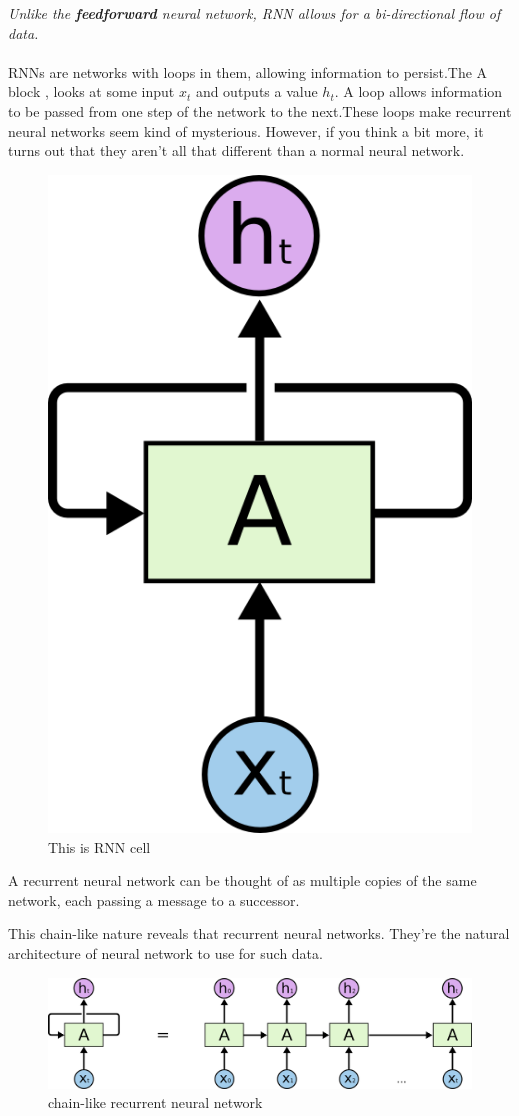 \textit{Unlike the \textbf{feedforward} neural network, RNN allows for a bi-directional flow of data.}\\\\
RNNs are networks with loops in them, allowing information to persist.The A block , looks at some input $x_t$ and outputs a value $h_t$. A loop allows information to be passed from one step of the network to the next.These loops make recurrent neural networks seem kind of mysterious. However, if you think a bit more, it turns out that they aren’t all that different than a normal neural network.
  \begin{figure}[H]%
    \center%
    \includegraphics[width=.3\textwidth]{images/amir/RNN-rolled.png}%
    \caption[Recurrent Neural Networks]{This is RNN cell}\label{fig:RNN cell}%
  \end{figure}
  \indent A recurrent neural network can be thought of as multiple copies of the same network, each passing a message to a successor.

This chain-like nature reveals that recurrent neural networks. They’re the natural architecture of neural network to use for such data.\\
  \begin{figure}[H]%
    \center%
    \includegraphics[width=\textwidth]{images/amir/RNN1-unrolled.png}%
    \caption[RNN unrolled]{chain-like recurrent neural network}\label{fig:RNN network}%
  \end{figure}

